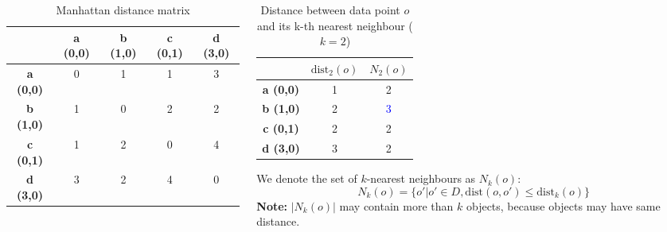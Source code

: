 \documentclass[aspectratio=169, 10pt]{beamer}
\begin{document}
\begin{frame}
\begin{columns}[t]
\begin{column}{0.5\textwidth}
            \begin{table}[]
                \scriptsize
                \begin{tabular}{c|cccc}
                             & \textbf{a (0,0)} & \textbf{b (1,0)} & \textbf{c (0,1)} & \textbf{d (3,0)} \\ \hline
                \textbf{a (0,0)} & 0            & 1            & 1            & 3            \\
                \textbf{b (1,0)} & 1            & 0            & 2            & 2            \\
                \textbf{c (0,1)} & 1            & 2            & 0            & 4            \\
                \textbf{d (3,0)} & 3            & 2            & 4            & 0           
                \end{tabular}
                \caption{Manhattan distance matrix}
            \end{table}
        \end{column}
        \begin{column}{0.5\textwidth}
            \begin{table}[]
                \scriptsize
                \begin{tabular}{c|cc}
                             & $\text{dist}_2(o)$ & $N_2(o)$ \\ \hline
                \textbf{a (0,0)} & 1 & 2 \\
                \textbf{b (1,0)} & 2 & \textcolor{blue}{3} \\
                \textbf{c (0,1)} & 2 & 2 \\
                \textbf{d (3,0)} & 3 & 2  
                \end{tabular}
                \caption{Distance between data point $o$ and its k-th nearest neighbour ($k=2$)}
            \end{table}
            We denote the set of $k$-nearest neighbours as $N_k(o)$:
            \[
                N_k(o) = \{o' | o' \in D, \text{dist}(o, o') \le \text{dist}_k(o)\}
            \]
            \textbf{Note:} $|N_k(o)|$ may contain more than $k$ objects, because objects may have same distance.
        \end{column}
    \end{columns}

\end{frame}
\end{document}
